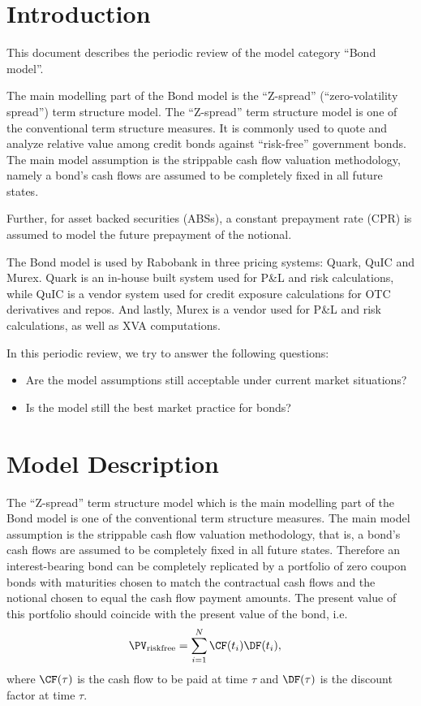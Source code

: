 \documentclass[reviewdoc]{pmv_report}  %
\begin{document}
\ConclusionsIntro{\conc}
\makecoverpage

\section{Introduction}

This document describes the periodic review of the model category ``Bond model''.

The main modelling part of the Bond model is the ``Z-spread'' (``zero-volatility spread'') term structure model.
The ``Z-spread'' term structure model is one of the conventional term structure measures.
It is commonly used to quote and analyze relative value among credit bonds against ``risk-free'' government bonds.
The main model assumption is the strippable cash flow valuation methodology, namely a bond's cash flows are assumed to be completely fixed in all future states.

Further, for asset backed securities (ABSs), a constant prepayment rate (CPR) is assumed to model the future prepayment of the notional.

The Bond model is used by Rabobank in three pricing systems: Quark, QuIC and Murex.
Quark is an in-house built system used for P\&L and risk calculations, while QuIC is a vendor system used for credit exposure calculations for OTC derivatives and repos.
And lastly, Murex is a vendor used for P\&L and risk calculations, as well as XVA computations.

In this periodic review, we try to answer the following questions:
\begin{itemize}
\item[-] Are the model assumptions still acceptable under current market situations?
\item[-] Is the model still the best market practice for bonds?
\end{itemize}


\section{Model Description}

The ``Z-spread'' term structure model which is the main modelling part of the Bond model is one of the conventional term structure measures.
The main model assumption is the strippable cash flow valuation methodology, that is, a bond's cash flows are assumed to be completely fixed in all future states.
Therefore an interest-bearing bond can be completely replicated by a portfolio of zero coupon bonds with maturities chosen to match the contractual cash flows  and the notional chosen to equal the cash flow payment amounts.
The present value of this portfolio should coincide with the present value of the bond, i.e.
\begin{align}
\PV_{\text{riskfree}} &=\sum_{i=1}^{N} \CF(t_i)\DF(t_i), \label{eq:strippable}
\end{align}
where $\CF(\tau)$ is the cash flow to be paid at time $\tau$ and $\DF(\tau)$ is the discount factor at time $\tau$.
\end{document}
